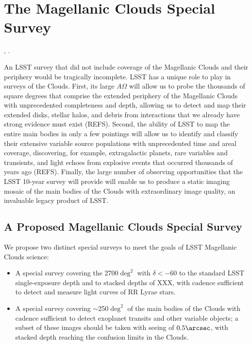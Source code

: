 %
%
%

\section{The Magellanic Clouds Special Survey}
\def\secname{mc}\label{sec:\secname}

,
.

An LSST survey that did not include coverage of the Magellanic Clouds
and their periphery would be tragically incomplete.  LSST has a unique
role to play in surveys of the Clouds.  First, its large $A\Omega$
will allow us to probe the thousands of square degrees that comprise
the extended periphery of the Magellanic Clouds with unprecedented
completeness and depth, allowing us to detect and map their extended
disks, stellar halos, and debris from interactions that we already
have strong evidence must exist (REFS).  Second, the ability of LSST
to map the entire main bodies in only a few pointings will allow us to
identify and classify their extensive variable source populations with
unprecedented time and areal coverage, discovering, for example,
extragalactic planets, rare variables and transients, and light echoes
from explosive events that occurred thousands of years ago (REFS).
Finally, the large number of observing opportunities that the LSST
10-year survey will provide will enable us to produce a static imaging
mosaic of the main bodies of the Clouds with extraordinary image
quality, an invaluable legacy product of LSST.


\subsection{A Proposed Magellanic Clouds Special Survey}
\label{sec:\secname:proposal}

We propose two distinct special surveys to meet the goals of LSST
Magellanic Clouds science:
\begin{itemize}
\item A special survey covering the 2700$\deg^2$ with $\delta < -60$ to
the standard LSST single-exposure depth and to stacked depths of XXX,
with cadence sufficient to detect and measure light curves of RR Lyrae
stars.
\item A special survey covering $\sim$250$\deg^2$ of the main bodies of
the Clouds with cadence sufficient to detect exoplanet transits and
other variable objects; a subset of these images should be taken with
seeing of $0.5\arcsec$, with stacked depth reaching the confusion
limits in the Clouds.
\end{itemize}

